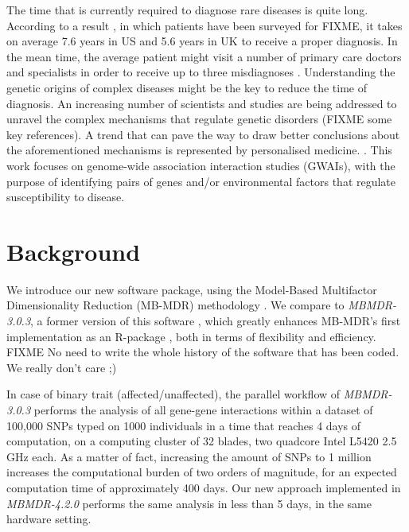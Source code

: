 \documentclass{bmcart}
\begin{document}
The time that is currently required to diagnose rare diseases is quite long. According to a result \cite{Shire2013}, in which patients have been surveyed for FIXME, it takes on average 7.6 years in US and 5.6 years in UK to receive a proper diagnosis. In the mean time, the average patient might visit a number of primary care doctors and specialists in order to receive up to three misdiagnoses \cite{Shire2013}. Understanding the genetic origins of complex diseases might be the key to reduce the time of diagnosis. An increasing number of scientists and studies are being addressed to unravel the complex mechanisms that regulate genetic disorders (FIXME some key references).
A trend that can pave the way to draw better conclusions about the aforementioned mechanisms is represented by personalised medicine.   
\cite{Shastry2006, VantVeer2008, Galas2009, Beevers2012, Lester2013}. This work focuses on genome-wide association interaction studies (GWAIs), with the purpose of identifying pairs of genes and/or environmental factors that regulate susceptibility to disease.

\section*{Background}


We introduce our new software package, using the Model-Based Multifactor Dimensionality Reduction (MB-MDR) methodology \cite{Calle2008, Calle2008b, Cattaert2011,Mahachie2012}. We compare to {\em MBMDR-3.0.3}, a former version of this software \cite{VanLishout2013}, which greatly enhances MB-MDR's first implementation as an R-package \cite{Calle2010}, both in terms of flexibility and efficiency. 
FIXME No need to write the whole history of the software that has been coded. We really don't care ;)


In case of binary trait (affected/unaffected), the parallel workflow of {\em MBMDR-3.0.3} performs the analysis of all gene-gene interactions within a dataset of 100,000 SNPs typed on 1000 individuals in a time that reaches 4 days of computation, on a computing cluster of 32 blades, two quadcore Intel L5420 2.5 GHz each. As a matter of fact, increasing the amount of SNPs to 1 million increases the computational burden of two orders of magnitude, for an expected computation time of approximately 400 days. Our new approach implemented in {\em MBMDR-4.2.0} performs the same analysis in less than 5 days, in the same hardware setting.
\end{document}
